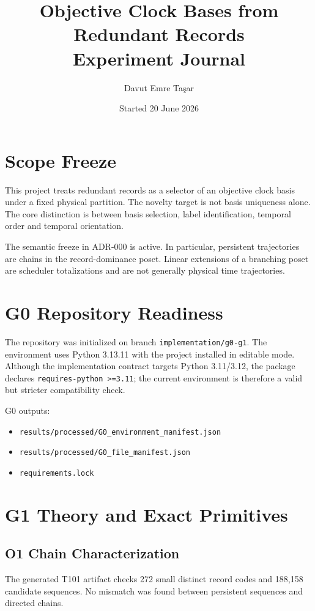 \documentclass[11pt]{article}
\title{Objective Clock Bases from Redundant Records\\Experiment Journal}
\author{Davut Emre Ta\c{s}ar}
\date{Started 20 June 2026}
\begin{document}
\maketitle

\section{Scope Freeze}

This project treats redundant records as a selector of an objective clock basis
under a fixed physical partition. The novelty target is not basis uniqueness
alone. The core distinction is between basis selection, label identification,
temporal order and temporal orientation.

The semantic freeze in ADR-000 is active. In particular, persistent trajectories
are chains in the record-dominance poset. Linear extensions of a branching poset
are scheduler totalizations and are not generally physical time trajectories.

\section{G0 Repository Readiness}

The repository was initialized on branch \texttt{implementation/g0-g1}. The
environment uses Python 3.13.11 with the project installed in editable mode.
Although the implementation contract targets Python 3.11/3.12, the package
declares \texttt{requires-python >=3.11}; the current environment is therefore a
valid but stricter compatibility check.

G0 outputs:
\begin{itemize}
  \item \texttt{results/processed/G0_environment_manifest.json}
  \item \texttt{results/processed/G0_file_manifest.json}
  \item \texttt{requirements.lock}
\end{itemize}

\section{G1 Theory and Exact Primitives}

\subsection{O1 Chain Characterization}

The generated T101 artifact checks 272 small distinct record codes and 188,158
candidate sequences. No mismatch was found between persistent sequences and
directed chains.
\end{document}
